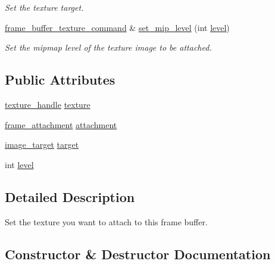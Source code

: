 \begin{DoxyCompactItemize}
\begin{DoxyCompactList}\small\item\em Set the texture target. \end{DoxyCompactList}\item 
\mbox{\hyperlink{classmoka_1_1frame__buffer__texture__command}{frame\+\_\+buffer\+\_\+texture\+\_\+command}} \& \mbox{\hyperlink{classmoka_1_1frame__buffer__texture__command_a37bd0d4d87f2d86813f34a7fc68e8768}{set\+\_\+mip\+\_\+level}} (int \mbox{\hyperlink{classmoka_1_1frame__buffer__texture__command_abf25ce4275230e90c02eb7b0009f59de}{level}})
\begin{DoxyCompactList}\small\item\em Set the mipmap level of the texture image to be attached. \end{DoxyCompactList}\end{DoxyCompactItemize}
\subsection*{Public Attributes}
\begin{DoxyCompactItemize}
\item 
\mbox{\hyperlink{structmoka_1_1texture__handle}{texture\+\_\+handle}} \mbox{\hyperlink{classmoka_1_1frame__buffer__texture__command_ac6986f87b2adb0c62e14f4b4989a19ff}{texture}}
\item 
\mbox{\hyperlink{namespacemoka_a0a44ecbb877dec1107d9915dc95c58d1}{frame\+\_\+attachment}} \mbox{\hyperlink{classmoka_1_1frame__buffer__texture__command_af5113c5b0be55658fdd03b2823dd5038}{attachment}}
\item 
\mbox{\hyperlink{namespacemoka_a6f402ae62a72ce17ff73fa94d526800e}{image\+\_\+target}} \mbox{\hyperlink{classmoka_1_1frame__buffer__texture__command_ac8ac280263dfea329a3a0d0d7650a802}{target}}
\item 
int \mbox{\hyperlink{classmoka_1_1frame__buffer__texture__command_abf25ce4275230e90c02eb7b0009f59de}{level}}
\end{DoxyCompactItemize}


\subsection{Detailed Description}
Set the texture you want to attach to this frame buffer. 

\subsection{Constructor \& Destructor Documentation}
\mbox{\label{classmoka_1_1frame__buffer__texture__command_a72fc6d54513756fe7ce7af898a41268f}} 

